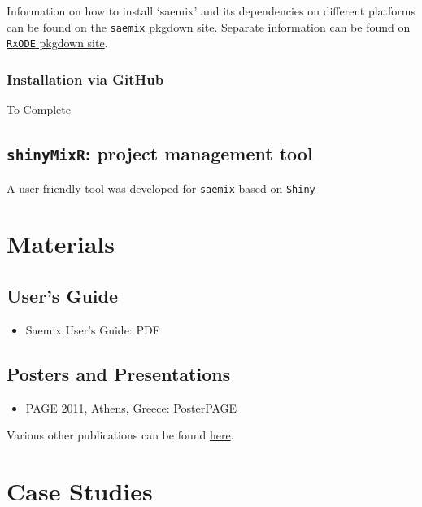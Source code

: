 \documentclass[]{book}
\providecommand{\tightlist}{%
  \setlength{\itemsep}{0pt}\setlength{\parskip}{0pt}}
\begin{document}
Information on how to install `saemix' and its dependencies on different
platforms can be found on the
\href{https://saemixdevelopment.github.io/saemix/index.html}{\texttt{saemix}
pkgdown site}. Separate information can be found on
\href{https://saemixdevelopment.github.io/RxODE/index.html}{\texttt{RxODE}
pkgdown site}.

\subsection{Installation via GitHub}\label{installation-via-github}

To Complete

\section{\texorpdfstring{\texttt{shinyMixR}: project management
tool}{shinyMixR: project management tool}}\label{shinymixr-project-management-tool}

A user-friendly tool was developed for \texttt{saemix} based on
\href{http://shiny.rstudio.com/}{\texttt{Shiny}}

\chapter{Materials}\label{materials}

\section{User's Guide}\label{users-guide}

\begin{itemize}
\tightlist
\item
  Saemix User's Guide: PDF
\end{itemize}

\section{Posters and Presentations}\label{posters-and-presentations}

\begin{itemize}
\tightlist
\item
  PAGE 2011, Athens, Greece: PosterPAGE
\end{itemize}

Various other publications can be found
\href{https://github.com/saemixdevelopment/Publications}{here}.

\chapter{Case Studies}\label{casestudies}
\end{document}
